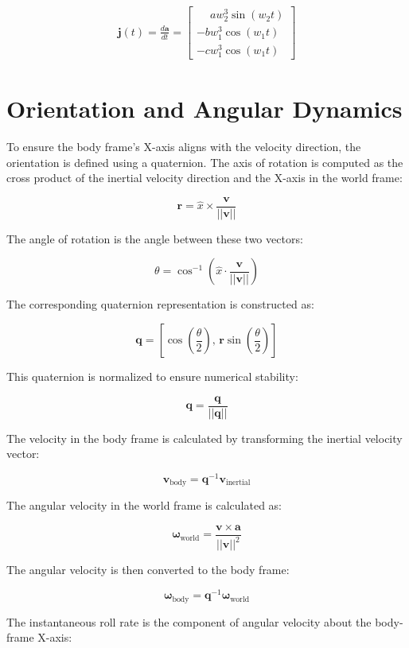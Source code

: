 \documentclass{article}
\begin{document}
\begin{align*}
	\mathbf{j}(t) = \frac{d\mathbf{a}}{dt} =
	\begin{bmatrix}
		\phantom{-} a w_2^3 \sin(w_2 t) \\
		- b w_1^3 \cos(w_1 t) \\
		- c w_1^3 \cos(w_1 t)
	\end{bmatrix}
\end{align*}


	\section{Orientation and Angular Dynamics}

	To ensure the body frame’s X-axis aligns with the velocity direction, the orientation is defined using a quaternion. The axis of rotation is computed as the cross product of the inertial velocity direction and the X-axis in the world frame:

	\[
	\mathbf{r} = \hat{x} \times \frac{\mathbf{v}}{||\mathbf{v}||}
	\]

	The angle of rotation is the angle between these two vectors:

	\[
	\theta = \cos^{-1}\left( \hat{x} \cdot \frac{\mathbf{v}}{||\mathbf{v}||} \right)
	\]

	The corresponding quaternion representation is constructed as:

	\[
	\mathbf{q} = \left[\cos\left(\frac{\theta}{2}\right),\, \mathbf{r} \sin\left(\frac{\theta}{2}\right)\right]
	\]

	This quaternion is normalized to ensure numerical stability:

	\[
	\mathbf{q} = \frac{\mathbf{q}}{||\mathbf{q}||}
	\]

	The velocity in the body frame is calculated by transforming the inertial velocity vector:

	\[
	\mathbf{v}_{\text{body}} = \mathbf{q}^{-1} \mathbf{v}_{\text{inertial}}
	\]

	The angular velocity in the world frame is calculated as:

	\[
	\boldsymbol{\omega}_{\text{world}} = \frac{\mathbf{v} \times \mathbf{a}}{||\mathbf{v}||^2}
	\]

	The angular velocity is then converted to the body frame:

	\[
	\boldsymbol{\omega}_{\text{body}} = \mathbf{q}^{-1} \boldsymbol{\omega}_{\text{world}}
	\]

	The instantaneous roll rate is the component of angular velocity about the body-frame X-axis:
\end{document}
